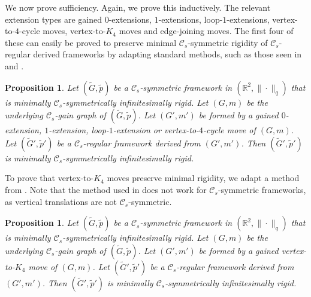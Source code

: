 \documentclass[reqno,a4paper,10pt]{article}
\newtheorem{proposition}[theorem]{Proposition}
\theoremstyle{definition}
\theoremstyle{remark}
\numberwithin{equation}{section}
\numberwithin{figure}{section}
\numberwithin{table}{section}
\newcommand{\R}{\mathbb{R}}
\newcommand{\G}{\tilde{G}}
\newcommand{\p}{\tilde{p}}
\begin{document}
    We now prove sufficiency. Again, we prove this inductively. The relevant extension types are gained $0$-extensions, $1$-extensions, loop-$1$-extensions, vertex-to-$4$-cycle moves, vertex-to-$K_4$ moves and edge-joining moves. The first four of these can easily be proved to preserve minimal $\mathcal{C}_s$-symmetric rigidity of $\mathcal{C}_s$-regular derived frameworks by adapting standard methods, such as those seen in \cite{EGRES} and \cite{NonEuclidean}.
    \begin{proposition}\label{LqCsStraightforwardExtensions}
		Let $(\G,\p)$ be a $\mathcal{C}_s$-symmetric framework in $(\R^2,\|\cdot\|_q)$ that is minimally $\mathcal{C}_s$-symmetrically infinitesimally rigid. Let $(G,m)$ be the underlying $\mathcal{C}_s$-gain graph of $(\G,\p)$. Let $(G',m')$ be formed by a gained $0$-extension, $1$-extension, loop-$1$-extension or vertex-to-$4$-cycle move of $(G,m)$. Let $(\G',\p')$ be a $\mathcal{C}_s$-regular framework derived from $(G',m')$. Then $(\G',\p')$ is minimally $\mathcal{C}_s$-symmetrically infinitesimally rigid.
	\end{proposition}
    To prove that vertex-to-$K_4$ moves preserve minimal rigidity, we adapt a method from \cite[Lemma 9]{Surfaces}. Note that the method used in \cite[Lemma 3.14]{NonEuclidean} does not work for $\mathcal{C}_s$-symmetric frameworks, as vertical translations are not $\mathcal{C}_s$-symmetric.
    \begin{proposition}\label{LqCsK4Extension}
		Let $(\G,\p)$ be a $\mathcal{C}_s$-symmetric framework in $(\R^2,\|\cdot\|_q)$ that is minimally $\mathcal{C}_s$-symmetrically infinitesimally rigid. Let $(G,m)$ be the underlying $\mathcal{C}_s$-gain graph of $(\G,\p)$. Let $(G',m')$ be formed by a gained vertex-to-$K_4$ move of $(G,m)$. Let $(\G',\p')$ be a $\mathcal{C}_s$-regular framework derived from $(G',m')$. Then $(\G',\p')$ is minimally $\mathcal{C}_s$-symmetrically infinitesimally rigid.
	\end{proposition}
\end{document}
